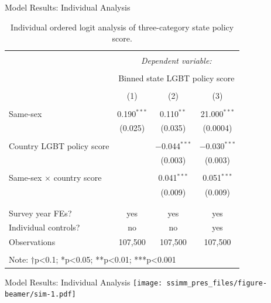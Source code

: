 \documentclass[
  ignorenonframetext,
]{beamer}
\begin{document}
\begin{frame}{Model Results: Individual Analysis}
\protect\hypertarget{model-results-individual-analysis}{}
\begin{table}[!htbp] \centering 
  \caption{Individual ordered logit analysis of three-category state policy score.} 
  \label{tab:ord} 
\tiny 
\begin{tabular}{@{\extracolsep{3pt}}lccc} 
\\[-1.8ex]\hline 
\hline \\[-1.8ex] 
 & \multicolumn{3}{c}{\textit{Dependent variable:}} \\ 
\cline{2-4} 
\\[-1.8ex] & \multicolumn{3}{c}{Binned state LGBT policy score} \\ 
\\[-1.8ex] & (1) & (2) & (3)\\ 
\hline \\[-1.8ex] 
 Same-sex & 0.190$^{***}$ & 0.110$^{**}$ & 21.000$^{***}$ \\ 
  & (0.025) & (0.035) & (0.0004) \\ 
  & & & \\ 
 Country LGBT policy score &  & $-$0.044$^{***}$ & $-$0.030$^{***}$ \\ 
  &  & (0.003) & (0.003) \\ 
  & & & \\ 
 Same-sex × country score &  & 0.041$^{***}$ & 0.051$^{***}$ \\ 
  &  & (0.009) & (0.009) \\ 
  & & & \\ 
\hline \\[-1.8ex] 
Survey year FEs? & yes & yes & yes \\ 
Individual controls? & no & no & yes \\ 
Observations & 107,500 & 107,500 & 107,500 \\ 
\hline 
\hline \\[-1.8ex] 
\multicolumn{4}{l}{Note: †p<0.1; *p<0.05; **p<0.01; ***p<0.001} \\ 
\end{tabular} 
\end{table}
\end{frame}

\begin{frame}{Model Results: Individual Analysis}
\protect\hypertarget{model-results-individual-analysis-1}{}
\texttt{[image: ssimm\_pres\_files/figure-beamer/sim-1.pdf]}
\end{frame}
\end{document}
